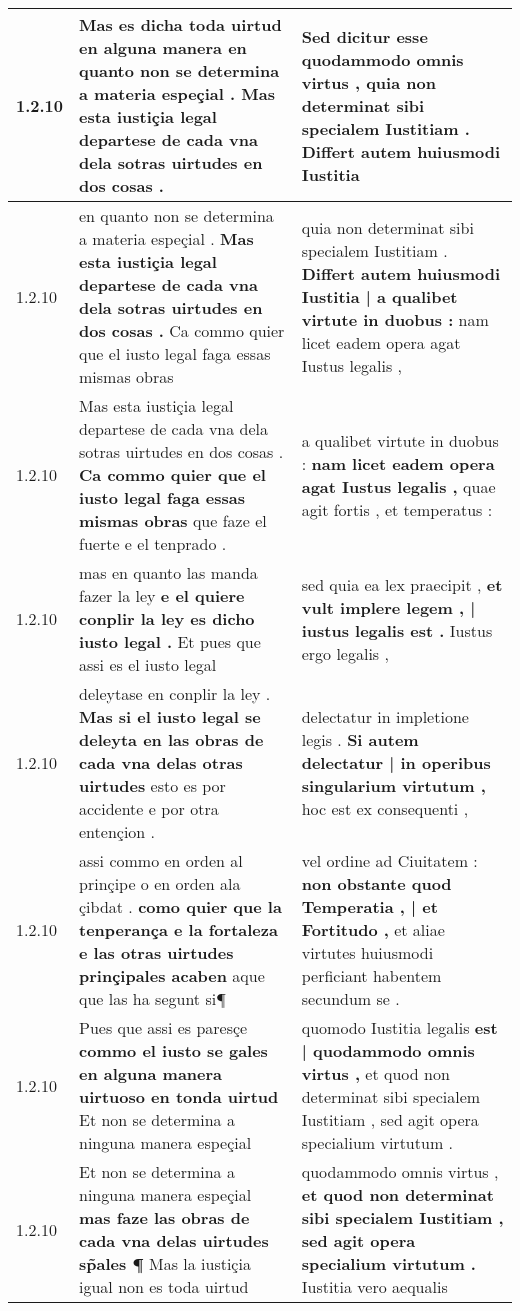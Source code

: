 \begin{tabular}{|p{1cm}|p{6.5cm}|p{6.5cm}|}
1.2.10 & Mas es dicha toda uirtud en alguna manera \textbf{ en quanto non se determina a materia espeçial . } Mas esta iustiçia legal departese de cada vna dela sotras uirtudes en dos cosas . & Sed dicitur esse quodammodo omnis virtus , \textbf{ quia non determinat sibi specialem Iustitiam . } Differt autem huiusmodi Iustitia \\\hline
1.2.10 & en quanto non se determina a materia espeçial . \textbf{ Mas esta iustiçia legal departese de cada vna dela sotras uirtudes en dos cosas . } Ca commo quier que el iusto legal faga essas mismas obras & quia non determinat sibi specialem Iustitiam . \textbf{ Differt autem huiusmodi Iustitia | a qualibet virtute in duobus : } nam licet eadem opera agat Iustus legalis , \\\hline
1.2.10 & Mas esta iustiçia legal departese de cada vna dela sotras uirtudes en dos cosas . \textbf{ Ca commo quier que el iusto legal faga essas mismas obras } que faze el fuerte e el tenprado . & a qualibet virtute in duobus : \textbf{ nam licet eadem opera agat Iustus legalis , } quae agit fortis , et temperatus : \\\hline
1.2.10 & mas en quanto las manda fazer la ley \textbf{ e el quiere conplir la ley es dicho iusto legal . } Et pues que assi es el iusto legal & sed quia ea lex praecipit , \textbf{ et vult implere legem , | iustus legalis est . } Iustus ergo legalis , \\\hline
1.2.10 & deleytase en conplir la ley . \textbf{ Mas si el iusto legal se deleyta en las obras de cada vna delas otras uirtudes } esto es por accidente e por otra entençion . & delectatur in impletione legis . \textbf{ Si autem delectatur | in operibus singularium virtutum , } hoc est ex consequenti , \\\hline
1.2.10 & assi commo en orden al prinçipe o en orden ala çibdat . \textbf{ como quier que la tenperança e la fortaleza e las otras uirtudes prinçipales acaben } aque que las ha segunt si¶ & vel ordine ad Ciuitatem : \textbf{ non obstante quod Temperatia , | et Fortitudo , } et aliae virtutes huiusmodi perficiant habentem secundum se . \\\hline
1.2.10 & Pues que assi es paresçe \textbf{ commo el iusto se gales en alguna manera uirtuoso en tonda uirtud } Et non se determina a ninguna manera espeçial & quomodo Iustitia legalis \textbf{ est | quodammodo omnis virtus , } et quod non determinat sibi specialem Iustitiam , sed agit opera specialium virtutum . \\\hline
1.2.10 & Et non se determina a ninguna manera espeçial \textbf{ mas faze las obras de cada vna delas uirtudes sp̃ales ¶ } Mas la iustiçia igual non es toda uirtud & quodammodo omnis virtus , \textbf{ et quod non determinat sibi specialem Iustitiam , sed agit opera specialium virtutum . } Iustitia vero aequalis \\\hline

\end{tabular}
